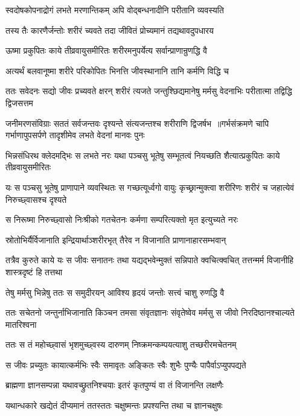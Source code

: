 \twolineshloka
{स्वदोषकोपनाद्रोगं लभते मरणान्तिकम्}
{अपि वोद्बन्धनादीनि परीतानि व्यवस्यति}


\twolineshloka
{तस्य तैः कारणैर्जन्तोः शरीरं च्यवते तदा}
{जीवितं प्रोच्यमानं तद्यथावदुपधारय}


\twolineshloka
{ऊष्मा प्रकुपितः काये तीव्रवायुसमीरितः}
{शरीरमनुपर्येत्य सर्वान्प्राणान्रुणद्धि वै}


\twolineshloka
{अत्यर्थं बलवानूष्मा शरीरे परिकोपितः}
{भिनत्ति जीवस्थानानि तानि कर्मणि विद्धि च}


\threelineshloka
{ततः सवेदनः सद्यो जीवः प्रच्यवते क्षरन्}
{शरीरं त्यजते जन्तुश्छिद्यमानेषु मर्मसु}
{वेदनाभिः परीतात्मा तद्विद्धि द्विजसत्तम}


\threelineshloka
{जनीमरणसंविग्राः सततं सर्वजन्तवः}
{दृश्यन्ते संत्यजन्तश्च शरीराणि द्विजर्षभ ॥गर्भसंक्रमणे चापि गर्भाणापुपसर्पणे}
{तादृशीमेव लभते वेदनां मानवः पुनः}


भिन्नसंधिरथ क्लेदमद्भिः स लभते नरः
\twolineshloka
{यथा पञ्चसु भूतेषु सम्भूतत्वं नियच्छति}
{शैत्यात्प्रकुपितः काये तीव्रवायुसमीरितः}


\threelineshloka
{यः स पञ्चसु भूतेषु प्राणापाने व्यवस्थितः}
{स गच्छत्यूर्ध्वगो वायुः कृच्छ्रान्मुक्त्वा शरीरिणः}
{शरीरं च जहात्येवं निरुच्छ्वासश्च दृश्यते}


\twolineshloka
{स निरूष्मा निरुच्छ्वासो निःश्रीको गतचेतनः}
{कर्मणा सम्परित्यक्तो मृत इत्युच्यते नरः}


\twolineshloka
{स्रोतोभिर्यैर्विजानाति इन्द्रियार्थाञ्शरीरभृत्}
{तैरेव न विजानाति प्राणानाहारसम्भवान्}


तत्रैव कुरुते काये यः स जीवः सनातनः
\twolineshloka
{तथा यद्यद्भवेन्मुक्तं सन्निपाते क्वचित्क्वचित्}
{तत्तन्मर्म विजानीहि शास्त्रदृष्टं हि तत्तथा}


\twolineshloka
{तेषु मर्मसु भिन्नेषु ततः स समुदीरयन्}
{आविश्य हृदयं जन्तोः सत्त्वं चाशु रुणद्धि वै}


\threelineshloka
{ततः सचेतनो जन्तुर्नाभिजानाति किञ्चन}
{तमसा संवृतज्ञानः संवृतेष्वेव मर्मसु}
{स जीवो निरदिष्ठानश्चाल्यते मातरिश्वना}


\twolineshloka
{ततः स तं महोच्छ्वासं भृशमुच्छ्वस्य दारुणम्}
{निष्क्रमन्कम्पयत्याशु तच्छरीरमचेतनम्}


\twolineshloka
{स जीवः प्रच्युतः कायात्कर्मभिः स्वैः समावृतः}
{अङ्कितः स्वैः शुभैः पुण्यैः पापैर्वाऽप्युपपद्यते}


\twolineshloka
{ब्राह्मणा ज्ञानसम्पन्ना यथावच्छ्रुतनिश्चयाः}
{इतरं कृतपुण्यं वा तं विजानन्ति लक्षणैः}


\twolineshloka
{यथान्धकारे खद्येतं दीप्यमानं ततस्ततः}
{चक्षुष्मन्तः प्रपश्यन्ति तथा च ज्ञानचक्षुषः}


